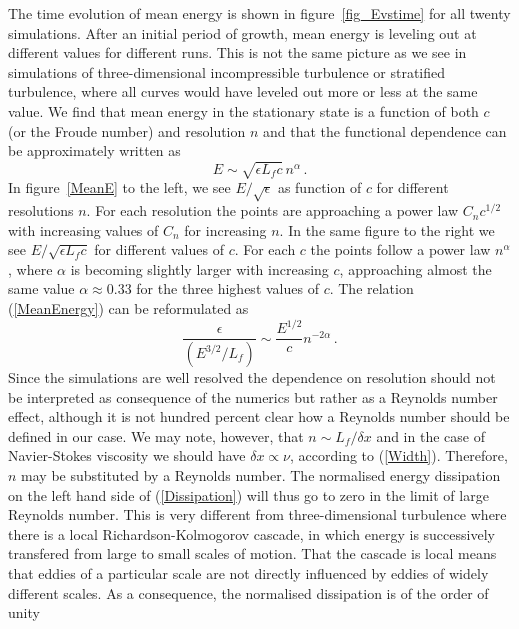 The time evolution of mean energy is shown in figure~\ref{fig_Evstime} for all
twenty simulations. After an initial period of growth, mean energy is leveling
out at different values for different runs. This is not the same picture as we
see in simulations of three-dimensional incompressible turbulence or stratified
turbulence, where all curves would have leveled out more or less at the same
value. We find that mean energy in the stationary state is a function of both $
c $ (or the Froude number) and resolution $ n $ and that the functional
dependence can be approximately written as
\begin{equation} \label{MeanEnergy}
E \sim \sqrt{\epsilon L_f c } \, n^{\alpha}  \, .
\end{equation}
 In figure~\ref{MeanE} to the
left, we see $ E/\sqrt{\epsilon} $ as function of $ c $ for different resolutions $
n $. For each resolution the points are approaching a power law $ C_n c^{1/2} $
with increasing values of $ C_n $ for increasing $ n $. In the same figure to
the right we see $ E/\sqrt{\epsilon L_f c } $ for different values of $ c $. For
each $ c $ the points follow a power law $ n^{\alpha} $, where $ \alpha $ is
becoming slightly larger with increasing $ c $, approaching almost the same
value $ \alpha \approx 0.33 $ for the three highest values of $ c $. The
relation (\ref{MeanEnergy}) can be reformulated as
\begin{equation} \label{Dissipation}
\frac{\epsilon} {(E^{3/2} / L_f)} \sim \frac{E^{1/2}}{c} n^{-2\alpha} \, .
\end{equation}
Since the simulations are well resolved the dependence on resolution should not
be interpreted as consequence of the numerics but rather as a Reynolds number
effect, although it is not hundred percent clear how a Reynolds number should
be defined in our case. We may note, however, that $ n \sim L_f/\delta x $ and in the case of Navier-Stokes viscosity
 we should have $ \delta x \propto \nu $, according to (\ref{Width}). Therefore,  $ n $ may be substituted by a Reynolds number. The normalised energy dissipation on the left hand side of
(\ref{Dissipation}) will thus go to zero in the limit of large Reynolds number.
This is very different from three-dimensional turbulence where there is a local
Richardson-Kolmogorov cascade, in which energy is successively transfered from
large to small scales of motion. That the cascade is local means that eddies of
a particular scale are not directly influenced by eddies of widely different
scales. As a consequence, the normalised dissipation is of the order of unity
